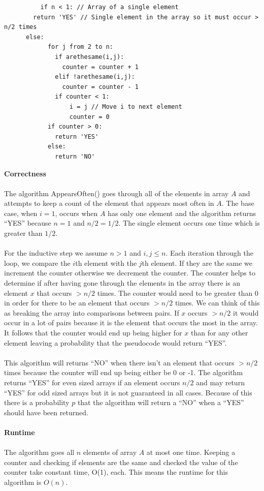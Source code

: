 \documentclass[12pt]{article}
\begin{document}
\begin{enumerate}
\begin{verbatim}
		  if n < 1: // Array of a single element
        return 'YES' // Single element in the array so it must occur > n/2 times
      else:
		    for j from 2 to n:
		      if arethesame(i,j):
		        counter = counter + 1
		      elif !arethesame(i,j):
		        counter = counter - 1
		      if counter < 1:
		          i = j // Move i to next element
		          counter = 0
		    if counter > 0:
		      return 'YES'
		    else:
		      return 'NO'		    
		\end{verbatim}
		\textbf{Correctness}\\
		\\
		The algorithm AppearsOften() goes through all of the elements in array $A$ and attempts to keep a count of the element that appears most often in $A$.  
    The base case, when $i = 1$, occurs when $A$ has only one element and the algorithm returns ``YES'' 
    because $n=1$ and $n/2 = 1/2$.  The single element occurs one time which is greater than $1/2$.\\
		\\
		For the inductive step we assume $n > 1$ and $i,j \le n$.  Each iteration through the loop, we compare the $i$th element with the $j$th element.  If they are the same we increment the counter otherwise we decrement the counter.  The counter helps to determine if after having gone through the elements in the array there is an element $x$ that occurs $> n/2$ times.  The counter would need to be greater than 0 in order for there to be an element that occurs $> n/2$ times.  We can think of this as breaking the array into comparisons between pairs.  If $x$ occurs $> n/2$ it would occur in a lot of pairs because it is the element that occurs the most in the array.
    It follows that the counter would end up being higher for $x$ than for any other element leaving a probability that the pseudocode would return ``YES''.\\
		\\
		This algorithm will returns ``NO'' when there isn't an element that occurs $> n/2$ times because the counter will end up being either be 0 or -1.  
    The algorithm returns ``YES'' for even sized arrays if an element occurs $n/2$ and may return ``YES'' for odd sized arrays but it is not guaranteed in all cases.
    Because of this there is a probability $p$ that the algorithm will return a ``NO'' when a ``YES'' should have been returned.\\      
		\\
		\textbf{Runtime}\\
		\\
		The algorithm goes all $n$ elements of array $A$ at most one time.  
		Keeping a counter and checking if elements are the 
		same and checked the value of the counter take constant time, O(1), each.
		This means the runtime for this algorithm is $O(n)$.
		

\end{enumerate}
\end{document}

